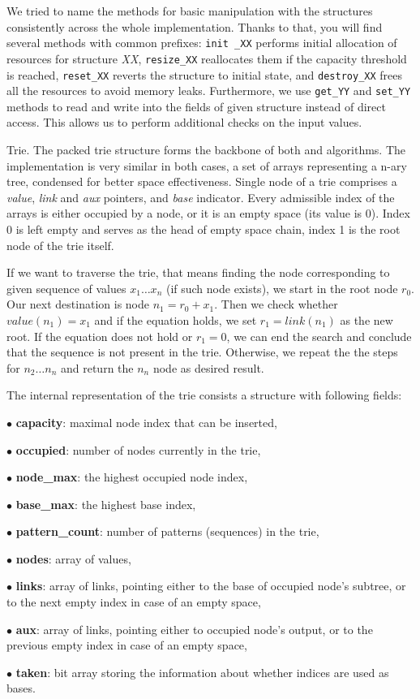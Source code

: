 We tried to name the methods for basic manipulation with the structures
consistently across the whole implementation.
Thanks to that, you will find several methods with common prefixes: {\tt init%
\_XX} performs initial allocation of
resources for structure {\it XX}, {\tt resize\_XX} reallocates them if the
capacity threshold is reached,
{\tt reset\_XX} reverts the structure to initial state, and {\tt destroy\_XX}
frees all the resources to avoid
memory leaks. Furthermore, we use {\tt get\_YY} and {\tt set\_YY} methods to
read and write into the fields of
given structure instead of direct access. This allows us to perform additional
checks on the input values.

\fi

Trie.
The packed trie structure forms the backbone of both \patgen{} and \utfpatgen{}
algorithms. The implementation is very
similar in both cases, a set of arrays representing a n-ary tree, condensed for
better space effectiveness. Single node
of a trie comprises a {\it value}, {\it link} and {\it aux} pointers, and {\it
base} indicator. Every admissible index
of the arrays is either occupied by a node, or it is an empty space (its value
is 0). Index 0 is left empty and serves
as the head of empty space chain, index 1 is the root node of the trie itself.

If we want to traverse the trie, that means finding the node corresponding to
given sequence of values $x_1 \dots x_n$
(if such node exists), we start in the root node $r_0$. Our next destination is
node $n_1 = r_0 + x_1$. Then we check
whether $value(n_1) = x_1$ and if the equation holds, we set $r_1 = link(n_1)$
as the new root. If the equation does
not hold or $r_1 = 0$, we can end the search and conclude that the sequence is
not present in the trie. Otherwise, we
repeat the the steps for $n_2 \dots n_n$ and return the $n_n$ node as desired
result.

The internal representation of the trie consists a structure with following
fields:

\item{$\bullet$} {\bf capacity}: maximal node index that can be inserted,
\item{$\bullet$} {\bf occupied}: number of nodes currently in the trie,
\item{$\bullet$} {\bf node\_max}: the highest occupied node index,
\item{$\bullet$} {\bf base\_max}: the highest base index,
\item{$\bullet$} {\bf pattern\_count}: number of patterns (sequences) in the
trie,
\item{$\bullet$} {\bf nodes}: array of values,
\item{$\bullet$} {\bf links}: array of links, pointing either to the base of
occupied node's subtree, or to the
next empty index in case of an empty space,
\item{$\bullet$} {\bf aux}: array of links, pointing either to occupied node's
output, or to the previous empty
index in case of an empty space,
\item{$\bullet$} {\bf taken}: bit array storing the information about whether
indices are used as bases.

